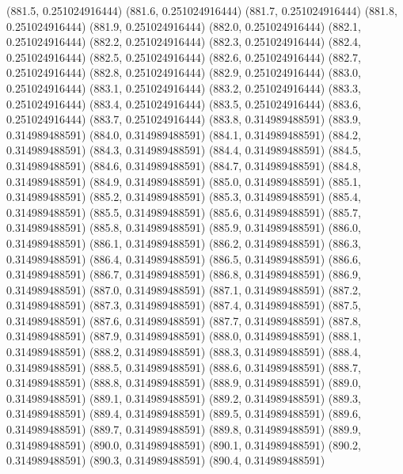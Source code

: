 {					(881.5, 0.251024916444)
					(881.6, 0.251024916444)
					(881.7, 0.251024916444)
					(881.8, 0.251024916444)
					(881.9, 0.251024916444)
					(882.0, 0.251024916444)
					(882.1, 0.251024916444)
					(882.2, 0.251024916444)
					(882.3, 0.251024916444)
					(882.4, 0.251024916444)
					(882.5, 0.251024916444)
					(882.6, 0.251024916444)
					(882.7, 0.251024916444)
					(882.8, 0.251024916444)
					(882.9, 0.251024916444)
					(883.0, 0.251024916444)
					(883.1, 0.251024916444)
					(883.2, 0.251024916444)
					(883.3, 0.251024916444)
					(883.4, 0.251024916444)
					(883.5, 0.251024916444)
					(883.6, 0.251024916444)
					(883.7, 0.251024916444)
					(883.8, 0.314989488591)
					(883.9, 0.314989488591)
					(884.0, 0.314989488591)
					(884.1, 0.314989488591)
					(884.2, 0.314989488591)
					(884.3, 0.314989488591)
					(884.4, 0.314989488591)
					(884.5, 0.314989488591)
					(884.6, 0.314989488591)
					(884.7, 0.314989488591)
					(884.8, 0.314989488591)
					(884.9, 0.314989488591)
					(885.0, 0.314989488591)
					(885.1, 0.314989488591)
					(885.2, 0.314989488591)
					(885.3, 0.314989488591)
					(885.4, 0.314989488591)
					(885.5, 0.314989488591)
					(885.6, 0.314989488591)
					(885.7, 0.314989488591)
					(885.8, 0.314989488591)
					(885.9, 0.314989488591)
					(886.0, 0.314989488591)
					(886.1, 0.314989488591)
					(886.2, 0.314989488591)
					(886.3, 0.314989488591)
					(886.4, 0.314989488591)
					(886.5, 0.314989488591)
					(886.6, 0.314989488591)
					(886.7, 0.314989488591)
					(886.8, 0.314989488591)
					(886.9, 0.314989488591)
					(887.0, 0.314989488591)
					(887.1, 0.314989488591)
					(887.2, 0.314989488591)
					(887.3, 0.314989488591)
					(887.4, 0.314989488591)
					(887.5, 0.314989488591)
					(887.6, 0.314989488591)
					(887.7, 0.314989488591)
					(887.8, 0.314989488591)
					(887.9, 0.314989488591)
					(888.0, 0.314989488591)
					(888.1, 0.314989488591)
					(888.2, 0.314989488591)
					(888.3, 0.314989488591)
					(888.4, 0.314989488591)
					(888.5, 0.314989488591)
					(888.6, 0.314989488591)
					(888.7, 0.314989488591)
					(888.8, 0.314989488591)
					(888.9, 0.314989488591)
					(889.0, 0.314989488591)
					(889.1, 0.314989488591)
					(889.2, 0.314989488591)
					(889.3, 0.314989488591)
					(889.4, 0.314989488591)
					(889.5, 0.314989488591)
					(889.6, 0.314989488591)
					(889.7, 0.314989488591)
					(889.8, 0.314989488591)
					(889.9, 0.314989488591)
					(890.0, 0.314989488591)
					(890.1, 0.314989488591)
					(890.2, 0.314989488591)
					(890.3, 0.314989488591)
					(890.4, 0.314989488591)
}
